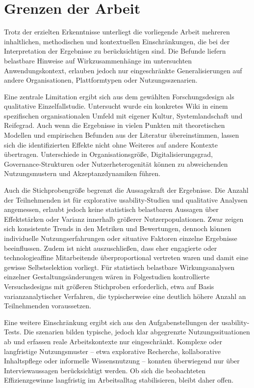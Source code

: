 \section{Grenzen der Arbeit}
\label{sec:08-02_limitations}

Trotz der erzielten Erkenntnisse unterliegt die vorliegende Arbeit mehreren inhaltlichen, methodischen und kontextuellen Einschränkungen, die bei der Interpretation der Ergebnisse zu berücksichtigen sind. Die Befunde liefern belastbare Hinweise auf Wirkzusammenhänge im untersuchten Anwendungskontext, erlauben jedoch nur eingeschränkte Generalisierungen auf andere Organisationen, Plattformtypen oder Nutzungsszenarien.

Eine zentrale Limitation ergibt sich aus dem gewählten Forschungsdesign als qualitative Einzelfallstudie. Untersucht wurde ein konkretes Wiki in einem spezifischen organisationalen Umfeld mit eigener Kultur, Systemlandschaft und Reifegrad. Auch wenn die Ergebnisse in vielen Punkten mit theoretischen Modellen und empirischen Befunden aus der Literatur übereinstimmen, lassen sich die identifizierten Effekte nicht ohne Weiteres auf andere Kontexte übertragen. Unterschiede in Organisationsgröße, Digitalisierungsgrad, Governance-Strukturen oder Nutzerheterogenität können zu abweichenden Nutzungsmustern und Akzeptanzdynamiken führen.

\newpage

Auch die Stichprobengröße begrenzt die Aussagekraft der Ergebnisse. Die Anzahl der Teilnehmenden ist für explorative \Gls{usability}-Studien und qualitative Analysen angemessen, erlaubt jedoch keine statistisch belastbaren Aussagen über Effektstärken oder Varianz innerhalb größerer Nutzerpopulationen. Zwar zeigen sich konsistente Trends in den Metriken und Bewertungen, dennoch können individuelle Nutzungserfahrungen oder situative Faktoren einzelne Ergebnisse beeinflussen. Zudem ist nicht auszuschließen, dass eher engagierte oder technologieaffine Mitarbeitende überproportional vertreten waren und damit eine gewisse Selbstselektion vorliegt.
Für statistisch belastbare Wirkungsanalysen einzelner Gestaltungsänderungen wären in Folgestudien kontrollierte Versuchsdesigns mit größeren Stichproben erforderlich, etwa auf Basis varianzanalytischer Verfahren, die typischerweise eine deutlich höhere Anzahl an Teilnehmenden voraussetzen.

Eine weitere Einschränkung ergibt sich aus den Aufgabenstellungen der \Gls{usability}-Tests. Die \Gls{szenarien} bilden typische, jedoch klar abgegrenzte Nutzungssituationen ab und erfassen reale Arbeitskontexte nur eingeschränkt. Komplexe oder langfristige Nutzungsmuster -- etwa explorative Recherche, kollaborative Inhaltspflege oder informelle Wissensnutzung -- konnten überwiegend nur über Interviewaussagen berücksichtigt werden. Ob sich die beobachteten Effizienzgewinne langfristig im Arbeitsalltag stabilisieren, bleibt daher offen.

